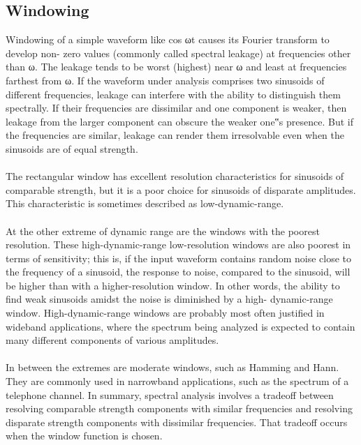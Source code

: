 \subsection{Windowing}
Windowing of a simple waveform like cos ωt causes its Fourier transform to develop non-
zero values (commonly called spectral leakage) at frequencies other than ω. The leakage
tends to be worst (highest) near ω and least at frequencies farthest from ω.
If the waveform under analysis comprises two sinusoids of different frequencies, leakage can
interfere with the ability to distinguish them spectrally. If their frequencies are dissimilar and
one component is weaker, then leakage from the larger component can obscure the weaker
one‟s presence. But if the frequencies are similar, leakage can render them irresolvable even
when the sinusoids are of equal strength.\\
\\
The rectangular window has excellent resolution characteristics for sinusoids of comparable
strength, but it is a poor choice for sinusoids of disparate amplitudes. This characteristic is
sometimes described as low-dynamic-range.\\
\\
At the other extreme of dynamic range are the windows with the poorest resolution. These
high-dynamic-range low-resolution windows are also poorest in terms of sensitivity; this is, if
the input waveform contains random noise close to the frequency of a sinusoid, the response
to noise, compared to the sinusoid, will be higher than with a higher-resolution window. In
other words, the ability to find weak sinusoids amidst the noise is diminished by a high-
dynamic-range window. High-dynamic-range windows are probably most often justified in
wideband applications, where the spectrum being analyzed is expected to contain many
different components of various amplitudes.\\
\\
In between the extremes are moderate windows, such as Hamming and Hann. They are
commonly used in narrowband applications, such as the spectrum of a telephone channel. In
summary, spectral analysis involves a tradeoff between resolving comparable strength
components with similar frequencies and resolving disparate strength components with
dissimilar frequencies. That tradeoff occurs when the window function is chosen.


